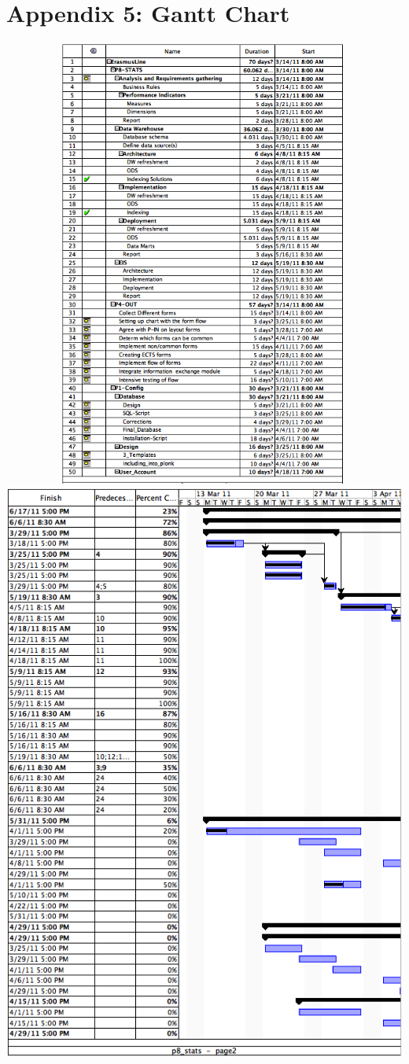 \chapter{Appendix 5: Gantt Chart} \label{apx5}
\includegraphics[width=500px,height=560px]{img/gantt1.png} \newpage
\includegraphics[scale=0.9]{img/gantt2.png} \newpage
